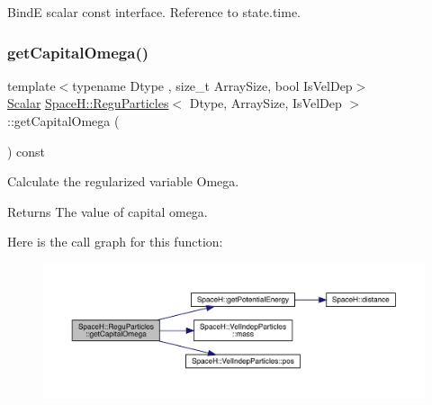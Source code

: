 BindE scalar const interface. Reference to state.\+time. 

\mbox{\label{class_space_h_1_1_regu_particles_a4f9e99c1492db8dbcfa232f285227cb6}} 
\subsubsection{\texorpdfstring{get\+Capital\+Omega()}{getCapitalOmega()}}
{\footnotesize\ttfamily template$<$typename Dtype , size\+\_\+t Array\+Size, bool Is\+Vel\+Dep$>$ \\
\mbox{\hyperlink{class_space_h_1_1_vel_indep_particles_aeb47d8131b30ed790320ff634f0d6af1}{Scalar}} \mbox{\hyperlink{class_space_h_1_1_regu_particles}{Space\+H\+::\+Regu\+Particles}}$<$ Dtype, Array\+Size, Is\+Vel\+Dep $>$\+::get\+Capital\+Omega (\begin{DoxyParamCaption}{ }\end{DoxyParamCaption}) const\hspace{0.3cm}{\ttfamily [inline]}}



Calculate the regularized variable Omega. 

\begin{DoxyReturn}{Returns}
The value of capital omega. 
\end{DoxyReturn}
Here is the call graph for this function\+:
\nopagebreak
\begin{figure}[H]
\begin{center}
\leavevmode
\includegraphics[width=350pt]{class_space_h_1_1_regu_particles_a4f9e99c1492db8dbcfa232f285227cb6_cgraph}
\end{center}
\end{figure}
\mbox{\label{class_space_h_1_1_regu_particles_a70cead0da9ed17befb6580ca6e6bc11c}} 
